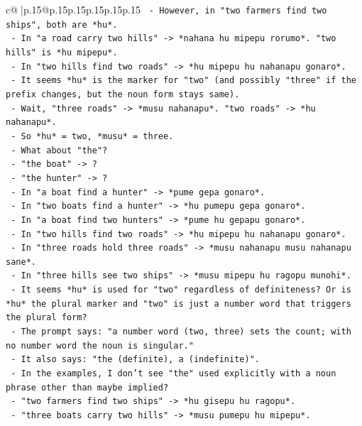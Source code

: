 \documentclass{article}
\begin{document}
{\begin{supertabular}{c@{$\;$}|p{.15\linewidth}@{}p{.15\linewidth}p{.15\linewidth}p{.15\linewidth}p{.15\linewidth}p{.15\linewidth}}
{{{\texttt{    {-} However, in "two farmers find two ships", both are *hu*.} \\
\texttt{    {-} In "a road carry two hills" {-}> *nahana hu mipepu rorumo*. "two hills" is *hu mipepu*.} \\
\texttt{    {-} In "two hills find two roads" {-}> *hu mipepu hu nahanapu gonaro*.} \\
\texttt{    {-} It seems *hu* is the marker for "two" (and possibly "three" if the prefix changes, but the noun form stays same).} \\
\texttt{    {-} Wait, "three roads" {-}> *musu nahanapu*. "two roads" {-}> *hu nahanapu*.} \\
\texttt{    {-} So *hu* = two, *musu* = three.} \\
\texttt{    {-} What about "the"?} \\
\texttt{    {-} "the boat" {-}> ?} \\
\texttt{    {-} "the hunter" {-}> ?} \\
\texttt{    {-} In "a boat find a hunter" {-}> *pume gepa gonaro*.} \\
\texttt{    {-} In "two boats find a hunter" {-}> *hu pumepu gepa gonaro*.} \\
\texttt{    {-} In "a boat find two hunters" {-}> *pume hu gepapu gonaro*.} \\
\texttt{    {-} In "two hills find two roads" {-}> *hu mipepu hu nahanapu gonaro*.} \\
\texttt{    {-} In "three roads hold three roads" {-}> *musu nahanapu musu nahanapu sane*.} \\
\texttt{    {-} In "three hills see two ships" {-}> *musu mipepu hu ragopu munohi*.} \\
\texttt{    {-} It seems *hu* is used for "two" regardless of definiteness? Or is *hu* the plural marker and "two" is just a number word that triggers the plural form?} \\
\texttt{    {-} The prompt says: "a number word (two, three) sets the count; with no number word the noun is singular."} \\
\texttt{    {-} It also says: "the (definite), a (indefinite)".} \\
\texttt{    {-} In the examples, I don't see "the" used explicitly with a noun phrase other than maybe implied?} \\
\texttt{    {-} "two farmers find two ships" {-}> *hu gisepu hu ragopu*.} \\
\texttt{    {-} "three boats carry two hills" {-}> *musu pumepu hu mipepu*.} \\
}}}
\end{supertabular}}
\end{document}
